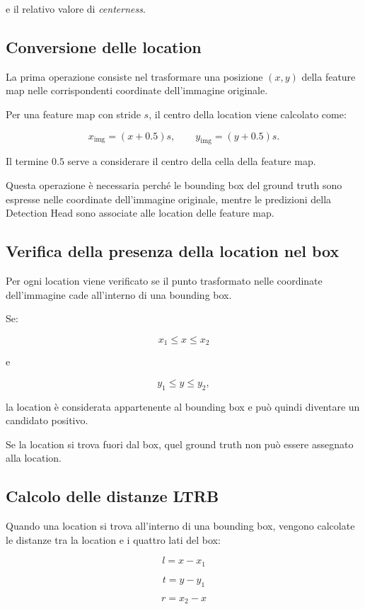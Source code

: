 e il relativo valore di \textit{centerness}.

\subsection{Conversione delle location}

La prima operazione consiste nel trasformare una posizione
$(x,y)$ della feature map nelle corrispondenti coordinate dell'immagine
originale.

Per una feature map con stride $s$, il centro della location viene calcolato
come:

\[
x_{\text{img}}=(x+0.5)s,
\qquad
y_{\text{img}}=(y+0.5)s.
\]

Il termine $0.5$ serve a considerare il centro della cella della feature map.

Questa operazione è necessaria perché le bounding box del ground truth sono
espresse nelle coordinate dell'immagine originale, mentre le predizioni della
Detection Head sono associate alle location delle feature map.

\subsection{Verifica della presenza della location nel box}

Per ogni location viene verificato se il punto trasformato nelle coordinate
dell'immagine cade all'interno di una bounding box.

Se:

\[
x_1 \leq x \leq x_2
\]

e

\[
y_1 \leq y \leq y_2,
\]

la location è considerata appartenente al bounding box e può quindi diventare
un candidato positivo.

Se la location si trova fuori dal box, quel ground truth non può essere
assegnato alla location.

\subsection{Calcolo delle distanze LTRB}

Quando una location si trova all'interno di una bounding box, vengono
calcolate le distanze tra la location e i quattro lati del box:

\[
l=x-x_1
\]

\[
t=y-y_1
\]

\[
r=x_2-x
\]

